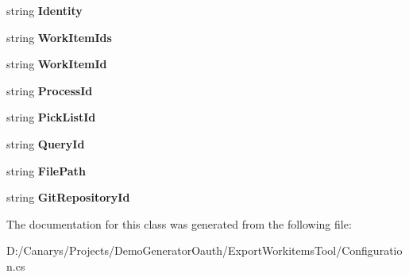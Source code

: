 \begin{DoxyCompactItemize}
string {\bfseries Identity}
\item 
\mbox{\label{class_templates_generator_tool_1_1_configuration_aa926161a0b00a2cb5cd09c1bd812037f}} 
string {\bfseries Work\+Item\+Ids}
\item 
\mbox{\label{class_templates_generator_tool_1_1_configuration_abf11ed77aaf36df00c317a9d75ee59ec}} 
string {\bfseries Work\+Item\+Id}
\item 
\mbox{\label{class_templates_generator_tool_1_1_configuration_ae1cfab93e3ac69daeab8155f712f75ff}} 
string {\bfseries Process\+Id}
\item 
\mbox{\label{class_templates_generator_tool_1_1_configuration_adf69b63a5476cd1017e1202d8e76e921}} 
string {\bfseries Pick\+List\+Id}
\item 
\mbox{\label{class_templates_generator_tool_1_1_configuration_ac258792c1668fecc38e6323777dbe97f}} 
string {\bfseries Query\+Id}
\item 
\mbox{\label{class_templates_generator_tool_1_1_configuration_a16c7678d486bd12405cae7c095f7461a}} 
string {\bfseries File\+Path}
\item 
\mbox{\label{class_templates_generator_tool_1_1_configuration_abaa1cf3f5625dd00844a676a5d745136}} 
string {\bfseries Git\+Repository\+Id}
\end{DoxyCompactItemize}


The documentation for this class was generated from the following file\+:\begin{DoxyCompactItemize}
\item 
D\+:/\+Canarys/\+Projects/\+Demo\+Generator\+Oauth/\+Export\+Workitems\+Tool/Configuration.\+cs\end{DoxyCompactItemize}
